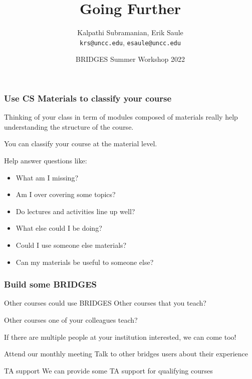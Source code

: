 \documentclass[aspectratio=169]{beamer}
\title{Going Further}
\subtitle{}
\author{Kalpathi Subramanian, Erik Saule\\\texttt{krs@uncc.edu}, \texttt{esaule@uncc.edu}}
\institute{The University of North Carolina at Charlotte}
\date{BRIDGES Summer Workshop 2022}
\begin{document}
\begin{frame}
\titlepage
\end{frame}



\begin{frame}
  \frametitle{Use CS Materials to classify your course}

  Thinking of your class in term of modules composed of materials really help understanding the structure of the course.

  You can classify your course at the material level.

  Help answer questions like:
  \begin{itemize}
  \item What am I missing?
  \item Am I over covering some topics?
  \item Do lectures and activities line up well?
  \item What else could I be doing?
  \item Could I use someone else materials?
  \item Can my materials be useful to someone else?
  \end{itemize}
\end{frame}

\begin{frame}
  \frametitle{Build some BRIDGES}
  \begin{block}{Other courses could use BRIDGES}
    Other courses that you teach?

    Other courses one of your colleagues teach?

    If there are multiple people at your institution interested, we can come too!
  \end{block}

  \begin{block}{Attend our monthly meeting}
    Talk to other bridges users about their experience
  \end{block}

  \begin{block}{TA support}
    We can provide some TA support for qualifying courses
  \end{block}
\end{frame}
\end{document}
